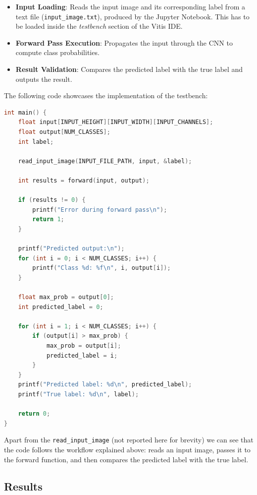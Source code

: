 \documentclass{article}
\begin{document}
\begin{itemize}
    \item \textbf{Input Loading}: Reads the input image and its corresponding label from a text file (\texttt{input\_image.txt}), produced by the Jupyter Notebook. This has to be loaded inside the \textit{testbench} section of the Vitis IDE.
    \item \textbf{Forward Pass Execution}: Propagates the input through the CNN to compute class probabilities.
    \item \textbf{Result Validation}: Compares the predicted label with the true label and outputs the result.
\end{itemize}

The following code showcases the implementation of the testbench:

\begin{lstlisting}[language=C]
int main() {
    float input[INPUT_HEIGHT][INPUT_WIDTH][INPUT_CHANNELS];
    float output[NUM_CLASSES];
    int label;

    read_input_image(INPUT_FILE_PATH, input, &label);

    int results = forward(input, output);

    if (results != 0) {
        printf("Error during forward pass\n");
        return 1;
    }

    printf("Predicted output:\n");
    for (int i = 0; i < NUM_CLASSES; i++) {
        printf("Class %d: %f\n", i, output[i]);
    }

    float max_prob = output[0];
    int predicted_label = 0;

    for (int i = 1; i < NUM_CLASSES; i++) {
        if (output[i] > max_prob) {
            max_prob = output[i];
            predicted_label = i;
        }
    }
    printf("Predicted label: %d\n", predicted_label);
    printf("True label: %d\n", label);

    return 0;
}
\end{lstlisting}

Apart from the \texttt{read\_input\_image} (not reported here for brevity) we can see that the code follows the workflow explained above: reads an input image, passes it to the forward function, and then compares the predicted label with the true label.

\newpage
\subsection{Results}
\end{document}
